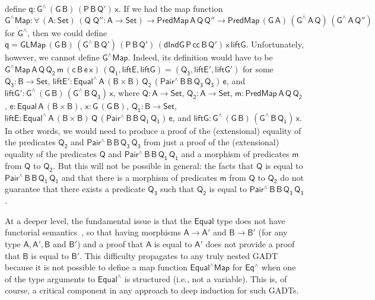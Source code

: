 \documentclass[9pt]{entcs}
\begin{document}
define $\mathsf{q : G^{\wedge}\,(G\,B)\,(P\,B\,Q')\,x}$.  If we had
the map function $\mathsf{G^\wedge Map : \forall\, (A : Set)\, (Q\;Q''
  : A \to Set) \to PredMap\,A\,Q\,Q'' \to
  PredMap\,(G\,A)\,(G^{\wedge}\,A\,Q)\,(G^{\wedge}\,A\,Q'')}$ for
$\mathsf{G^{\wedge}}$, then we could define $\mathsf{q =
  GLMap\,(G\,B)\,(G^{\wedge}\,B\,Q')\,(P\,B\,Q')\,
  (dIndG\,P\,cc\,B\,Q')\,x\,liftG}$.  Unfortunately, however, we
cannot define $\mathsf{G^\wedge Map}$.  Indeed, its definition would
have to be $ \mathsf{G^\wedge Map\,A\,Q\,Q_2\,m\,(c\,B\,e\,x)\,(Q_1,
  liftE, liftG) = (Q_3, liftE', liftG')}$ for some $\mathsf{Q_3 : B
  \to Set}$, $\mathsf{liftE' : Equal^{\wedge}\,A\,(B \times
  B)\,Q_2\,(Pair^{\wedge}\,B\,B\,Q_3\,Q_3)\,e}$, and $\mathsf{liftG' :
  G^{\wedge}\,(G\,B)\,(G^{\wedge}\,B\,Q_3)\,x}$, where $\mathsf{Q : A
  \to Set}$, $\mathsf{Q_2 : A \to Set}$, $\mathsf{m :
  PredMap\,A\,Q\,Q_2}$, $\mathsf{e : Equal\,A\,(B \times B)}$,
$\mathsf{x : G\,(G\,B)}$, $\mathsf{Q_1 : B \to Set}$, $\mathsf{liftE :
  Equal^{\wedge}\,A\,(B \times
  B)\,Q\,(Pair^{\wedge}\,B\,B\,Q_1\,Q_1)\,e}$, and $\mathsf{liftG :
  G^{\wedge}\,(G\,B)\,(G^{\wedge}\,B\,Q_1)\,x}$. In other words, we
would need to produce a proof of the (extensional) equality of the
predicates $\mathsf{Q_2}$ and $\mathsf{Pair^{\wedge}\,B\,B\,Q_3\,Q_3}$
from just a proof
of the (extensional) equality of the predicates $\mathsf{Q}$ and
$\mathsf{Pair^{\wedge}\,B\,B\,Q_1\,Q_1}$ and a morphism of predicates
$\mathsf{m}$ from $\mathsf{Q}$ to $\mathsf{Q_2}$.
But this will not be possible in general: the facts that $\mathsf{Q}$
is equal to $\mathsf{Pair^{\wedge}\,B\,B\,Q_1\,Q_1}$ and that there is
a morphism of predicates $\mathsf{m}$ from $\mathsf{Q}$ to
$\mathsf{Q_2}$ do not guarantee that there exists a predicate
$\mathsf{Q_3}$ such that $\mathsf{Q_2}$ is equal to
$\mathsf{Pair^{\wedge}\,B\,B\,Q_3\,Q_3}$.

At a deeper level, the fundamental issue is that the $\mathsf{Equal}$
type does not have functorial semantics~\cite{jgj21}, so that having
morphisms $\mathsf{A \to A'}$ and $\mathsf{B \to B'}$ (for any type
$\mathsf{A, A', B}$ and $\mathsf{B'}$) and a proof that $\mathsf{A}$
is equal to $\mathsf{A'}$ does not provide a proof that $\mathsf{B}$
is equal to $\mathsf{B'}$. This difficulty propagates to any truly
nested GADT because it is not possible to define a map function
$\mathsf{Equal^\wedge Map}$ for $\mathsf{Eq^\wedge}$ when one of the
type arguments to $\mathsf{Equal^\wedge}$ is structured (i.e., not a
variable). This is, of course, a critical component in any approach to
deep induction for such GADTs.
\end{document}
